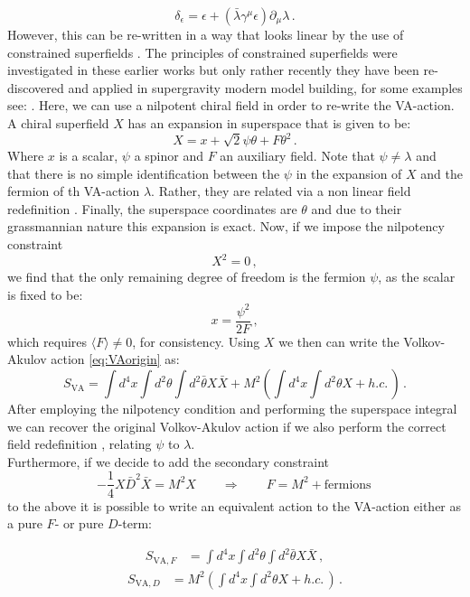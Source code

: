\documentclass[a4paper,12pt]{report}
\newcommand{\be}{\begin{equation}}
\newcommand{\ee}{\end{equation}}
\newcommand{\bea}{\begin{equation}\begin{aligned}}
\newcommand{\eea}{\end{aligned}\end{equation}}
\begin{document}
\be 
\delta_\epsilon = \epsilon +  \left(\bar{\lambda} \gamma^\mu \epsilon\right) \partial_\mu \lambda\,.
\ee
However, this can be re-written in a way that looks linear by the use of constrained superfields \cite{Rocek:1978nb,Lindstrom:1979kq,Samuel:1982uh,Komargodski:2009rz}. The principles of constrained superfields were investigated in these earlier works but only rather recently they have been re-discovered and applied in supergravity modern model building, for some examples see: \cite{Kallosh:2016aep,Vercnocke:2016fbt,GarciadelMoral:2017vnz,Kallosh:2018nrk,Kallosh:2019apq,Cribiori:2019hod,Cribiori:2019bfx,Kallosh:2019zgd,Cribiori:2020zoh,Cribiori:2020bgt}. Here, we can use a nilpotent chiral field in order to re-write the VA-action. A chiral superfield $X$ has an expansion in superspace that is given to be:
\be 
X = x + \sqrt{2} \psi \theta + F \theta^2\,.
\ee
Where $x$ is a scalar, $\psi$ a spinor and $F$ an auxiliary field. Note that $\psi \neq \lambda$ and that there is no simple identification between the $\psi$ in the expansion of $X$ and the fermion of th VA-action $\lambda$. Rather, they are related via a non linear field redefinition \cite{Bergshoeff:2015jxa}. Finally, the superspace coordinates are $\theta$ and due to their grassmannian nature this expansion is exact. Now, if we impose the nilpotency constraint
\be 
X^2 = 0\,,
\ee
we find that the only remaining degree of freedom is the fermion $\psi$, as the scalar is fixed to be:
\be 
x = \frac{\psi^2}{2 F}\,,
\ee 
which requires $\langle F \rangle \neq 0$, for consistency. Using $X$ we then can write the Volkov-Akulov action \eqref{eq:VAorigin} as:
\be 
S_{\text{VA}} = \int d^4x \int d^2 \theta \int d^2 \bar{\theta} X \bar{X} + M^2 \left( \int d^4 x \int d^2\theta X + h.c.\,\right)\,.
\ee
After employing the nilpotency condition and performing the superspace integral we can recover the original Volkov-Akulov action if we also perform the correct field redefinition \cite{Bergshoeff:2015jxa}, relating $\psi$ to $\lambda$.\\
Furthermore, if we decide to add the secondary constraint 
\be 
-\frac{1}{4} X \bar{D}^2 \bar{X} = M^2 X \qquad \Rightarrow \qquad F = M^2 + \text{fermions}\,
\label{eq:secconst}
\ee
to the above it is possible to write an equivalent action to the VA-action either as a pure $F$- or pure $D$-term:

\bea 
S_{\text{VA},F} &= \int d^4x \int d^2 \theta \int d^2 \bar{\theta} X \bar{X}\,,
\eea
\bea
S_{\text{VA},D} &=  M^2 \left( \int d^4 x \int d^2\theta X + h.c.\,\right)\,.
\eea
\end{document}

